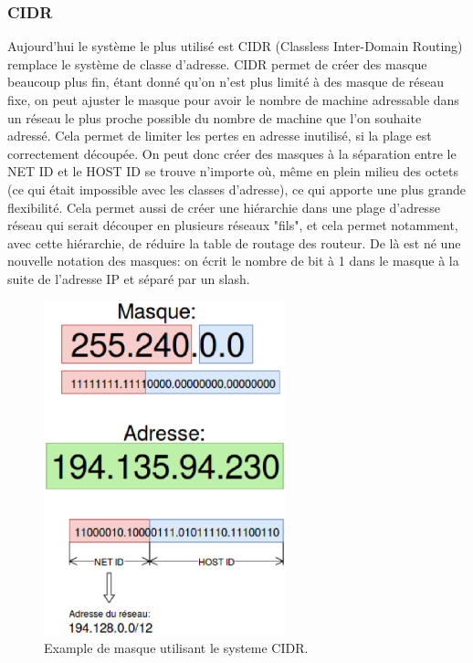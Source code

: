 \subsubsection{CIDR}

Aujourd'hui le système le plus utilisé est CIDR (Classless Inter-Domain
Routing) remplace le système de classe d'adresse. CIDR permet de créer des
masque beaucoup plus fin, étant donné qu'on n'est plus limité à des masque de
réseau fixe, on peut ajuster le masque pour avoir le nombre de machine
adressable dans un réseau le plus proche possible du nombre de machine que l'on
souhaite adressé.  Cela permet de limiter les pertes en adresse inutilisé, si
la plage est correctement découpée.  On peut donc créer des masques à la
séparation entre le NET ID et le HOST ID se trouve n'importe où, même en plein
milieu des octets (ce qui était impossible avec les classes d'adresse), ce qui
apporte une plus grande flexibilité.  Cela permet aussi de créer une hiérarchie
dans une plage d'adresse réseau qui serait découper en plusieurs réseaux
"fils", et cela permet notamment, avec cette hiérarchie, de réduire la table de
routage des routeur.  De là est né une nouvelle notation des masques: on écrit
le nombre de bit à 1 dans le masque à la suite de l'adresse IP et séparé par un
slash.


\begin{figure}
\centering
\includegraphics[width=7cm]{./pics/maskipv4cidr.eps}
\caption{Example de masque utilisant le systeme CIDR.}
\label{fig:exmask}
\end{figure}


